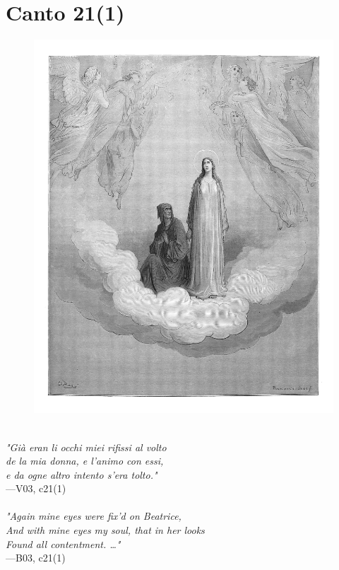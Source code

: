 \documentclass[../Dore_vision.tex]{subfiles}
\begin{document}
\newpage

\section{Canto 21(1)}

\begin{figure}[ht]
\centering
\includegraphics[height=\figsize]{illustrations/book_3/V03, c21(1).jpg}
\end{figure}

\begin{center}
\begin{minipage}{0.8\linewidth}
\textit{\\
"Già eran li occhi miei rifissi al volto\\de la mia donna, e l’animo con essi,\\e da ogne altro intento s’era tolto."} \\
—V03, c21(1) \\~\\
\textit{"Again mine eyes were fix'd on Beatrice,\\And with mine eyes my soul, that in her looks\\Found all contentment. …"} \\
—B03, c21(1)
\end{minipage}
\end{center}
\end{document}
